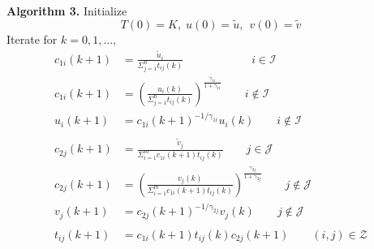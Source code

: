 \documentclass[twocolumn]{article}
\newtheorem{theorem}{Theorem}
\begin{document}
{\bf Algorithm 3.}
Initialize
 \[
 T(0)= K, \; u(0) = \tilde{u}, \; \,v(0) = \tilde{v}
 \]
Iterate for $k=0,1, \dots$,
 \begin{equation}
 \begin{aligned}
c_{1i}(k+1) 	&=  \frac{\tilde{u}_i}{\Sigma_{j=1}^n t_{ij}(k)}	\qquad \qquad \qquad i \in \mathcal{I}	\label{eq:c_1Iterate}	\\
 c_{1i}(k+1)  &= \left(\frac{u_i(k)}{\Sigma_{j=1}^n t_{ij}(k)}\right)^{\frac{\gamma_{1i} }{1+\gamma_{1i}}}	
 \qquad i \notin \mathcal{I}\\
 u_{i}(k+1) &= c_{1i}(k+1)^{-1/\gamma_{1i}} u_i(k)
   \qquad i \notin \mathcal{I} \\
\\
 c_{2j}(k+1) 	&=  \frac{\tilde{v}_j}{\Sigma_{i=1}^m c_{1i}(k+1) t_{ij}(k)}	
  \qquad j \in \mathcal{J} \\
 c_{2j}(k+1)  &= \left(\frac{v_j(k)}{\Sigma_{i=1}^m c_{1i}(k+1)t_{ij}(k)}\right)^{\frac{\gamma_{2j} }{1+\gamma_{2j}}}
   \qquad  j \notin \mathcal{J} \\
  v_{j}(k+1) &= c_{2j}(k+1)^{-1/\gamma_{2j}} v_j(k)	
   \qquad j \notin \mathcal{J} \\
  \\
   t_{ij}(k+1)   &= c_{1i}(k+1)t_{ij}(k)c_{2j}(k+1)	\qquad (i,j) \in \mathcal{Z}
 \end{aligned}
 \end{equation}





\end{document}
